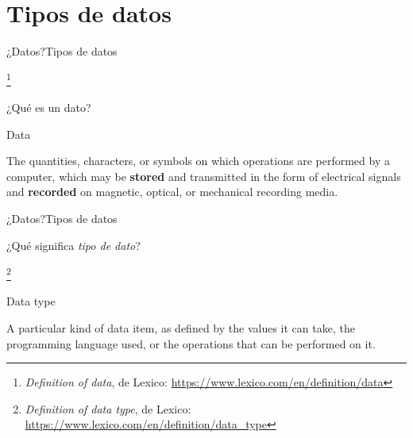 \documentclass[spanish]{beamer}
\newcommand\blfootnote[1]{%
\begingroup
\renewcommand\thefootnote{}\footnote{#1}%
\addtocounter{footnote}{-1}%
\endgroup
}
\begin{document}
\section{Tipos de datos}

\begin{frame}{¿Datos?}{Tipos de datos}

    \blfootnote{\textit{Definition of data}, de Lexico: \url{https://www.lexico.com/en/definition/data}}

    ¿Qué es un dato? \pause

    \bigskip
    
    \begin{block}{Data}
        \begin{displayquote}
            The \alert<3->{quantities}, \alert<3->{characters}, or \alert<3->{symbols} on which \alert<3->{operations} are performed by a computer, which may be \textbf<4->{stored} and transmitted in the form of electrical signals and \textbf<4->{recorded} on magnetic, optical, or mechanical recording media.
        \end{displayquote}
    \end{block} \pause

\end{frame}

\begin{frame}{¿Datos?}{Tipos de datos}

    ¿Qué significa \textit{tipo de dato}? \pause

    \blfootnote{\textit{Definition of data type}, de Lexico: \url{https://www.lexico.com/en/definition/data\_type}}

    \begin{block}{Data type}
        \begin{displayquote}
            A particular kind of data item, as defined by \alert<3->{the values it can take}, the programming language used, or \alert<3->{the operations that can be performed on it}.
        \end{displayquote}
    \end{block} \pause
\end{frame}
\end{document}
